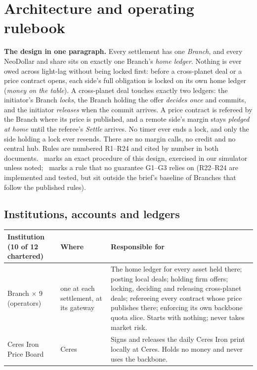 \section{Architecture and operating rulebook}

\textbf{The design in one paragraph.} Every settlement has one \emph{Branch}, and every NeoDollar and share sits on
exactly one Branch's \emph{home ledger}. Nothing is ever owed across light-lag without being locked first: before a
cross-planet deal or a price contract opens, each side's full obligation is locked on its own home ledger
(\emph{money on the table}). A cross-planet deal touches exactly two ledgers: the initiator's Branch \emph{locks},
the Branch holding the offer \emph{decides once} and commits, and the initiator \emph{releases} when the commit
arrives. A price contract is refereed by the Branch where its price is published, and a remote side's margin stays
\emph{pledged at home} until the referee's \emph{Settle} arrives. No timer ever ends a lock, and only the side holding
a lock ever resends. There are no margin calls, no credit and no central hub. Rules are numbered R1--R24 and cited by
number in both documents. \implemented\ marks an exact procedure of this design, exercised in our simulator unless
noted; \extension\ marks a rule that no guarantee G1--G3 relies on (R22--R24 are implemented and tested, but sit outside
the brief's baseline of Branches that follow the published rules).

\subsection{Institutions, accounts and ledgers}

\begin{table}[H]\centering
\begin{tabularx}{\linewidth}{>{\raggedright\arraybackslash}p{3.1cm}>{\raggedright\arraybackslash}p{2.6cm}X}
\toprule
Institution (10 of 12 chartered) & Where & Responsible for\\
\midrule
Branch $\times$ 9 (operators) & one at each settlement, at its gateway & The home ledger for every asset held there; posting
local deals; holding firm offers; locking, deciding and releasing cross-planet deals; refereeing every contract whose
price publishes there; enforcing its own backbone quota slice. Starts with nothing; never takes market risk.\\
Ceres Iron Price Board & Ceres & Signs and releases the daily Ceres Iron print locally at Ceres. Holds no money and
never uses the backbone.\\
\bottomrule
\end{tabularx}
\end{table}

